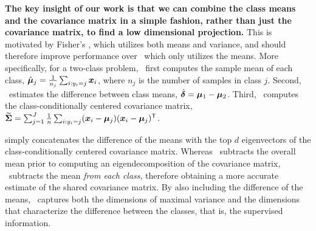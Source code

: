 \documentclass[10pt]{article}
\begin{document}

\textbf{The key insight of our work is that we can combine the class means and the covariance matrix in a simple fashion, rather than just the covariance matrix, to find a low dimensional projection.}
This is motivated  by Fisher's \Lda, which utilizes both means and variance, and should therefore improve performance over \Pca~which only utilizes the means. 
More specifically, for a two-class problem, \Lol~first computes the sample mean of each class,  $\hat{\boldsymbol{\mu}}_j = \frac{1}{n_j} \sum_{i : y_i = j} \boldsymbol{x}_i$, where $n_j$ is the number of samples in class $j$.  Second, \Lol~estimates the difference between class means,  $\hat{\boldsymbol{\delta}}=\boldsymbol{\mu}_1 - \boldsymbol{\mu}_2$.  
Third, \Lol~computes the class-conditionally centered covariance matrix, 
$\widetilde{\boldsymbol{\Sigma}}= \sum_{j=1}^J \frac{1}{n} \sum_{i : y_i = j} (\boldsymbol{x}_i - \boldsymbol{\mu}_j) (\boldsymbol{x}_i - \boldsymbol{\mu}_j)^{\mathsf{T}}$. 

simply concatenates the difference of the means with the top $d$ eigenvectors of the class-conditionally centered covariance matrix.
Whereas \Pca~subtracts the overall mean prior to computing an eigendecomposition of the covariance matrix, 
\Lol~subtracts the mean \emph{from each class}, therefore obtaining a more accurate estimate of the shared covariance matrix.
By also including the difference of the means, \Lol~captures both the dimensions of maximal variance and the dimensions that characterize the difference between the classes, that is, the supervised information.
%   
\end{document}
